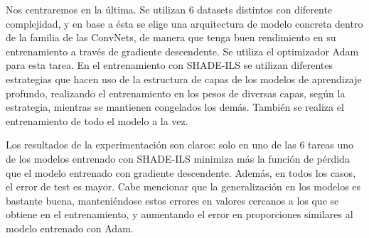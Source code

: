 Nos centraremos en la última. Se utilizan 6 datasets distintos con diferente complejidad, y en base a ésta se elige una arquitectura de modelo concreta dentro de la familia de las ConvNets, de manera que tenga buen rendimiento en su entrenamiento a través de gradiente descendente. Se utiliza el optimizador Adam para esta tarea. En el entrenamiento con SHADE-ILS se utilizan diferentes estrategias que hacen uso de la estructura de capas de los modelos de aprendizaje profundo, realizando el entrenamiento en los pesos de diversas capas, según la estrategia, mientras se mantienen congelados los demás. También se realiza el entrenamiento de todo el modelo a la vez.

Los resultados de la experimentación son claros: solo en uno de las 6 tareas uno de los modelos entrenado con SHADE-ILS minimiza más la función de pérdida que el modelo entrenado con gradiente descendente. Además, en todos los casos, el error de test es mayor. Cabe mencionar que la generalización en los modelos es bastante buena, manteniéndose estos errores en valores cercanos a los que se obtiene en el entrenamiento, y aumentando el error en proporciones similares al modelo entrenado con Adam.


